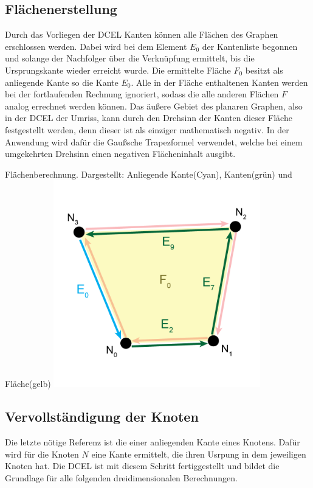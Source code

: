 \subsection{Flächenerstellung}
Durch das Vorliegen der DCEL Kanten können alle Flächen des Graphen erschlossen werden.
Dabei wird bei dem Element $E_0$ der Kantenliste begonnen und solange der Nachfolger über die Verknüpfung ermittelt, bis die Ursprungskante wieder erreicht wurde.
Die ermittelte Fläche $F_0$ besitzt als anliegende Kante so die Kante $E_0$.
Alle in der Fläche enthaltenen Kanten werden bei der fortlaufenden Rechnung ignoriert, sodass die alle anderen Flächen $F$ analog errechnet werden können.
Das äußere Gebiet des planaren Graphen, also in der DCEL der Umriss, kann durch den Drehsinn der Kanten dieser Fläche festgestellt werden, denn dieser ist als einziger mathematisch negativ.
In der Anwendung wird dafür die Gaußsche Trapezformel verwendet, welche bei einem umgekehrten Drehsinn einen negativen Flächeninhalt ausgibt.

\begin{Bild}{Flächenberechnung. Dargestellt: Anliegende Kante(Cyan), Kanten(grün) und Fläche(gelb)}
	\includegraphics[width = 90mm]{Bilder/FlaecheBerechnung}
\end{Bild}

\subsection{Vervollständigung der Knoten}
Die letzte nötige Referenz ist die einer anliegenden Kante eines Knotens.
Dafür wird für die Knoten $N$ eine Kante ermittelt, die ihren Usrpung in dem jeweiligen Knoten hat.
Die DCEL ist mit diesem Schritt fertiggestellt und bildet die Grundlage für alle folgenden dreidimensionalen Berechnungen.
